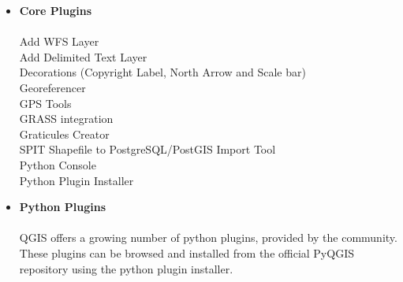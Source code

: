 \begin{itemize}
\item \textbf{Core Plugins}
\\ \\ Add WFS Layer
\\ Add Delimited Text Layer
\\ Decorations (Copyright Label, North Arrow and Scale bar)
\\ Georeferencer
\\ GPS Tools
\\ GRASS integration
\\ Graticules Creator
\\ SPIT Shapefile to PostgreSQL/PostGIS Import Tool
\\ Python Console
\\ Python Plugin Installer
\\ \item \textbf{Python Plugins}
\\ \\ QGIS offers a growing number of python plugins, provided by the
community. These plugins can be browsed and installed from the official
PyQGIS repository using the python plugin installer.
\end{itemize}







